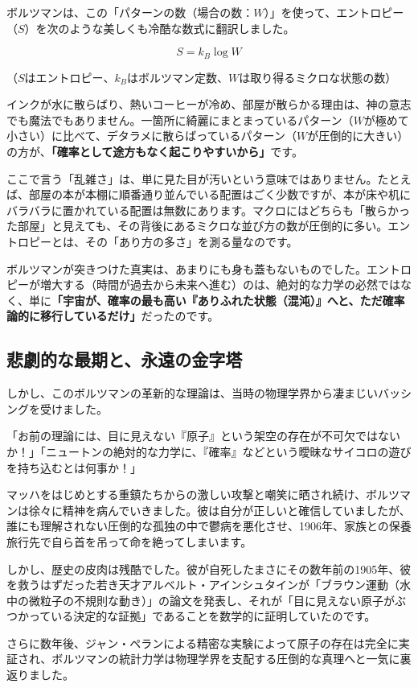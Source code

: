 ボルツマンは、この「パターンの数（場合の数：\(W\)）」を使って、エントロピー（\(S\)）を次のような美しくも冷酷な数式に翻訳しました。

\[
S=k_B\log W
\]

（\(S\)はエントロピー、\(k_B\)はボルツマン定数、\(W\)は取り得るミクロな状態の数）

インクが水に散らばり、熱いコーヒーが冷め、部屋が散らかる理由は、神の意志でも魔法でもありません。一箇所に綺麗にまとまっているパターン（\(W\)が極めて小さい）に比べて、デタラメに散らばっているパターン（\(W\)が圧倒的に大きい）の方が、\textbf{「確率として途方もなく起こりやすいから」}です。

ここで言う「乱雑さ」は、単に見た目が汚いという意味ではありません。たとえば、部屋の本が本棚に順番通り並んでいる配置はごく少数ですが、本が床や机にバラバラに置かれている配置は無数にあります。マクロにはどちらも「散らかった部屋」と見えても、その背後にあるミクロな並び方の数が圧倒的に多い。エントロピーとは、その「あり方の多さ」を測る量なのです。

ボルツマンが突きつけた真実は、あまりにも身も蓋もないものでした。エントロピーが増大する（時間が過去から未来へ進む）のは、絶対的な力学の必然ではなく、単に\textbf{「宇宙が、確率の最も高い『ありふれた状態（混沌）』へと、ただ確率論的に移行しているだけ」}だったのです。

\subsection{悲劇的な最期と、永遠の金字塔}

しかし、このボルツマンの革新的な理論は、当時の物理学界から凄まじいバッシングを受けました。

「お前の理論には、目に見えない『原子』という架空の存在が不可欠ではないか！」「ニュートンの絶対的な力学に、『確率』などという曖昧なサイコロの遊びを持ち込むとは何事か！」

マッハをはじめとする重鎮たちからの激しい攻撃と嘲笑に晒され続け、ボルツマンは徐々に精神を病んでいきました。彼は自分が正しいと確信していましたが、誰にも理解されない圧倒的な孤独の中で鬱病を悪化させ、1906年、家族との保養旅行先で自ら首を吊って命を絶ってしまいます。

しかし、歴史の皮肉は残酷でした。彼が自死したまさにその数年前の1905年、彼を救うはずだった若き天才アルベルト・アインシュタインが「ブラウン運動（水中の微粒子の不規則な動き）」の論文を発表し、それが「目に見えない原子がぶつかっている決定的な証拠」であることを数学的に証明していたのです。

さらに数年後、ジャン・ペランによる精密な実験によって原子の存在は完全に実証され、ボルツマンの統計力学は物理学界を支配する圧倒的な真理へと一気に裏返りました。

